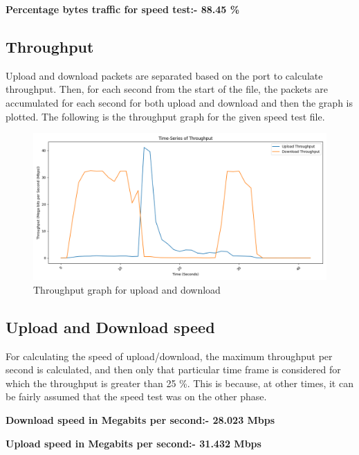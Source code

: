 \documentclass{article}
\begin{document}
\textbf{Percentage bytes traffic for speed test:- 88.45 \%}

\subsection{Throughput}
Upload and download packets are separated based on the port to calculate throughput. Then, for each second from the start of the file, the packets are accumulated for each second for both upload and download and then the graph is plotted. The following is the throughput graph for the given speed test file.

    \begin{figure}[H]
    \centering
    \includegraphics[width=\textwidth]{avg_throughput.png}
    \caption*{Throughput graph for upload and download}
    \end{figure}

\subsection{Upload and Download speed}
For calculating the speed of upload/download, the maximum throughput per second is calculated, and then only that particular time frame is considered for which the throughput is greater than 25 \%. This is because, at other times, it can be fairly assumed that the speed test was on the other phase. 

\textbf{Download speed in Megabits per second:- 28.023 Mbps}

\textbf{Upload speed in Megabits per second:- 31.432 Mbps}
\end{document}
